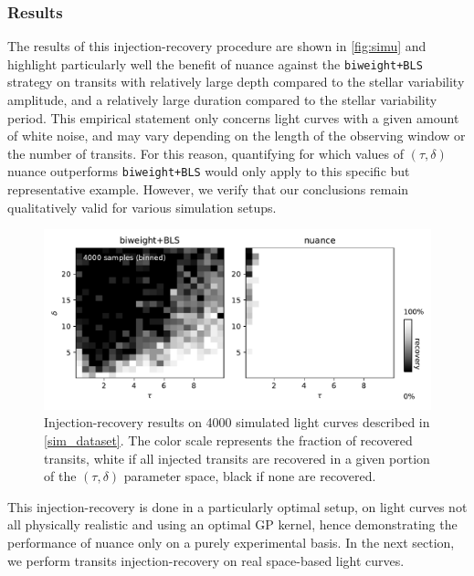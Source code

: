 \documentclass[modern]{aastex631}
\newcommand{\wtls}{\texttt{biweight+BLS}}
\begin{document}
\subsubsection*{Results}
The results of this injection-recovery procedure are shown in \autoref{fig:simu} and highlight particularly well the benefit of \textsf{nuance} against the \wtls{} strategy on transits with relatively large depth compared to the stellar variability amplitude, and a relatively large duration compared to the stellar variability period. This empirical statement only concerns light curves with a given amount of white noise, and may vary depending on the length of the observing window or the number of transits. For this reason, quantifying for which values of $(\tau, \delta)$ \textsf{nuance} outperforms \wtls{} would only apply to this specific but representative example. However, we verify that our conclusions remain qualitatively valid for various simulation setups.
\begin{figure}[H]
    \begin{centering}
        \includegraphics[width=\linewidth]{../workflows/synthetic-injection-recovery/figures/synthetic_ir.pdf}
        \caption{Injection-recovery results on 4000 simulated light curves described in \autoref{sim_dataset}. The color scale represents the fraction of recovered transits, white if all injected transits are recovered in a given portion of the $(\tau, \delta)$ parameter space, black if none are recovered.}
        \label{fig:simu}
    \end{centering}
\end{figure}

\noindent This injection-recovery is done in a particularly optimal setup, on light curves not all physically realistic and using an optimal GP kernel, hence demonstrating the performance of \textsf{nuance} only on a purely experimental basis. In the next section, we perform transits injection-recovery on real space-based light curves.
\end{document}
